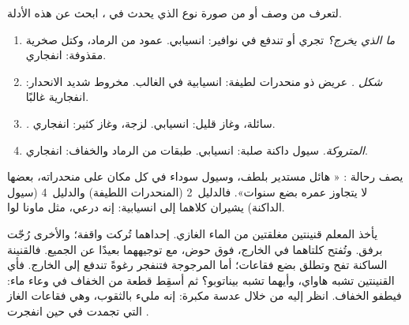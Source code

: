 \begin{method}\label{met:g7:volcanoes:clues}
لتعرف من وصف أو من صورة نوع  الذي يحدث في
، ابحث عن هذه الأدلة.
\begin{enumerate}
  \item \emph{ما الذي يخرج؟}  تجري أو تندفع في نوافير:
        انسيابي. عمود من الرماد، وكتل صخرية مقذوفة: انفجاري.
  \item \emph{شكل .}  عريض ذو منحدرات
        لطيفة:  انسيابية في الغالب. مخروط شديد الانحدار: انفجارية غالبًا.
  \item \emph{.} سائلة، وغاز قليل: انسيابي. لزجة، وغاز كثير:
        انفجاري.
  \item \emph{ المتروكة.} سيول  داكنة صلبة: انسيابي.
        طبقات من الرماد والخفاف: انفجاري.
\end{enumerate}
\end{method}

\begin{example}\label{ex:g7:volcanoes:clues}
يصف رحالة : « هائل مستدير بلطف، وسيول  سوداء
في كل مكان على منحدراته، بعضها لا يتجاوز عمره بضع سنوات».
فالدليل~2 (المنحدرات اللطيفة) والدليل~4 (سيول  الداكنة) يشيران كلاهما إلى 
انسيابية: إنه  درعي، مثل ماونا لوا.
\end{example}

\begin{inthelab}
يأخذ المعلم قنينتين مغلقتين من الماء الغازي. إحداهما تُركت
واقفة؛ والأخرى رُجّت برفق. وتُفتح كلتاهما في الخارج، فوق
حوض، مع توجيههما بعيدًا عن الجميع. فالقنينة الساكنة تفح وتطلق
بضع فقاعات؛ أما المرجوجة فتنفجر رغوةً تندفع إلى الخارج. فأي
القنينتين تشبه  هاواي، وأيهما تشبه  بيناتوبو؟ ثم أسقِط
قطعة من الخفاف  في وعاء ماء: فيطفو الخفاف. انظر
إليه من خلال عدسة مكبرة: إنه مليء بالثقوب، وهي فقاعات الغاز
التي تجمدت في  حين انفجرت .
\end{inthelab}

